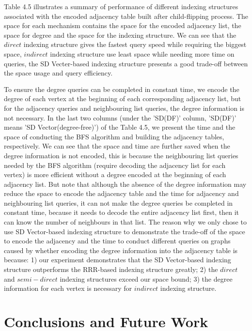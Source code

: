 \documentclass[12pt,glossary]{dalthesis}
\begin{document}
\bigskip

Table 4.5 illustrates a summary of performance of different indexing structures associated with the encoded adjacency table built after child-flipping process. The space for each mechanism contains the space for the encoded adjacency list, the space for degree and the space for the indexing structure. We can see that the $direct$ indexing structure gives the fastest query speed while requiring the biggest space, $indirect$ indexing structure use least space while needing more time on queries, the SD Vecter-based indexing structure presents a good trade-off between the space usage and query efficiency. 

\bigskip
\bigskip

To ensure the degree queries can be completed in constant time, we encode the degree of each vertex at the beginning of each corresponding adjacency list, but for the adjacency queries and neighbouring list queries, the degree information is not necessary. In the last two columns (under the 'SD(DF)' column, 'SD(DF)' means 'SD Vector(degree-free)') of the Table 4.5, we present the time and the space of conducting the BFS algorithm and building the adjacency tables, respectively. We can see that the space and time are further saved when the degree information is not encoded, this is because the neighbouring list queries needed by the BFS algorithm (require decoding the adjacency list for each vertex) is more efficient without a degree encoded at the beginning of each adjacency list. But note that although the absence of the degree information may reduce the space to encode the adjacency table and the time for adjacency and neighbouring list queries, it can not make the degree queries be completed in constant time, because it needs to decode the entire adjacency list first, then it can know the number of neighbours in that list. The reason why we only chose to use SD Vector-based indexing structure to demonstrate the trade-off of the space to encode the adjacency and the time to conduct different queries on graphs caused by whether encoding the degree information into the adjacency table is because: 1) our experiment demonstrates that the SD Vector-based indexing structure outperforms the RRR-based indexing structure greatly; 2) the $direct$ and $semi-direct$ indexing structures exceed our space bound; 3) the degree information for each vertex is necessary for $indirect$ indexing structure.  


\chapter{Conclusions and Future Work}
\end{document}
